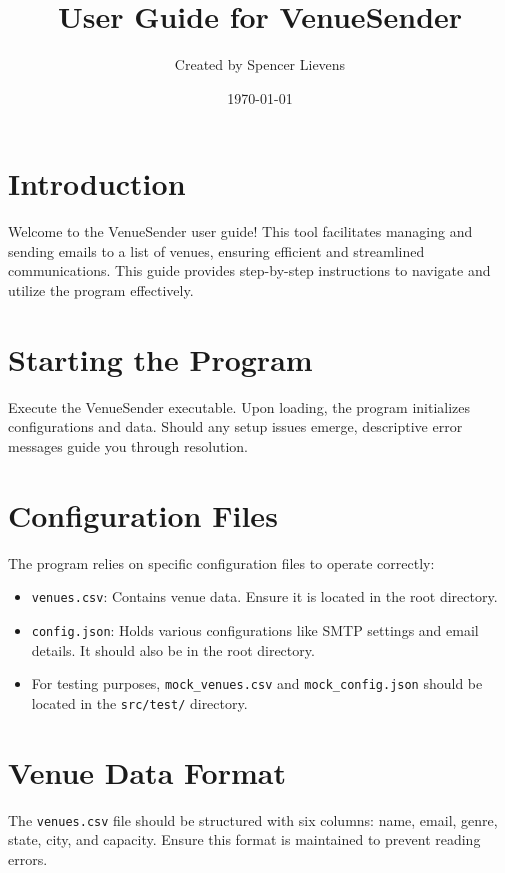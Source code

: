 \documentclass{article}
\title{\color{textcolor}User Guide for VenueSender}
\begin{document}
\author{Created by Spencer Lievens}
\date{\today}

	\maketitle
	
	\section*{Introduction}
	Welcome to the VenueSender user guide! This tool facilitates managing and sending emails to a list of venues, ensuring efficient and streamlined communications. This guide provides step-by-step instructions to navigate and utilize the program effectively.
	
	\section*{Starting the Program}
	Execute the VenueSender executable. Upon loading, the program initializes configurations and data. Should any setup issues emerge, descriptive error messages guide you through resolution.
	
	\section*{Configuration Files}
	The program relies on specific configuration files to operate correctly:
	\begin{itemize}
		\item \texttt{venues.csv}: Contains venue data. Ensure it is located in the root directory.
		\item \texttt{config.json}: Holds various configurations like SMTP settings and email details. It should also be in the root directory.
		\item For testing purposes, \texttt{mock\_venues.csv} and \texttt{mock\_config.json} should be located in the \texttt{src/test/} directory.
	\end{itemize}
	
	\section*{Venue Data Format}
	The \texttt{venues.csv} file should be structured with six columns: name, email, genre, state, city, and capacity. Ensure this format is maintained to prevent reading errors.
	
\end{document}
